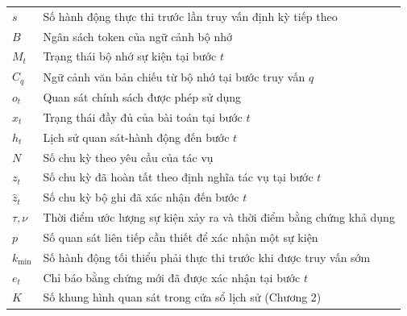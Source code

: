 \documentclass[fontsize=13pt,paper=a4,DIV=calc,oneside,open=any,headings=normal,numbers=noenddot]{scrbook}
\begin{document}
\begin{longtable}{p{}p{}}
$s$ & Số hành động thực thi trước lần truy vấn định kỳ tiếp theo\\
$B$ & Ngân sách token của ngữ cảnh bộ nhớ\\
$M_t$ & Trạng thái bộ nhớ sự kiện tại bước $t$\\
$C_q$ & Ngữ cảnh văn bản chiếu từ bộ nhớ tại bước truy vấn $q$\\
$o_t$ & Quan sát chính sách được phép sử dụng\\
$x_t$ & Trạng thái đầy đủ của bài toán tại bước $t$\\
$h_t$ & Lịch sử quan sát-hành động đến bước $t$\\
$N$ & Số chu kỳ theo yêu cầu của tác vụ\\
$z_t$ & Số chu kỳ đã hoàn tất theo định nghĩa tác vụ tại bước $t$\\
$\hat z_t$ & Số chu kỳ bộ ghi đã xác nhận đến bước $t$\\
$\tau,\nu$ & Thời điểm ước lượng sự kiện xảy ra và thời điểm bằng chứng khả dụng\\
$p$ & Số quan sát liên tiếp cần thiết để xác nhận một sự kiện\\
$k_{\min}$ & Số hành động tối thiểu phải thực thi trước khi được truy vấn sớm\\
$e_t$ & Chỉ báo bằng chứng mới đã được xác nhận tại bước $t$\\
$K$ & Số khung hình quan sát trong cửa sổ lịch sử (Chương 2)\\
\end{longtable}
\mainmatter





\cleardoublepage
{}
{}



\appendix

\end{document}
